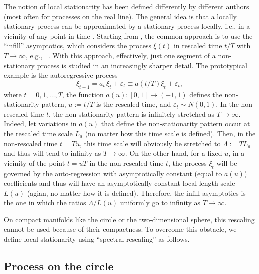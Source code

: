 \documentclass[12pt]{article}
\newcommand{\eg}{e.g.,\ }
\newcommand{\ie}{i.e., }
\begin{document}
The notion of local stationarity has been defined differently by different authors
(most often for  processes on the real line).
The general idea is that a locally stationary process can be approximated by a stationary process
locally, \ie in a vicinity of any point in time \citep{Mallat}.
Starting from \citet{Dahlhaus1997}, the common approach 
is to use the ``infill'' asymptotics, which considers the process $\xi(t)$
in rescaled time $t/T$ with  $T \to \infty$, \eg  
\citet[][]{Dahlhaus2012}.
With this approach, effectively, just one segment of a non-stationary process is studied
in an increasingly sharper detail.
The prototypical example is the autoregressive process 
%
\begin {equation}
\label{Dahl1}
\xi_{t+1} = a_t \,\xi_t +  \varepsilon_t \equiv  a(t/T) \xi_t +  \varepsilon_t,
\end {equation}
%
where $t=0,1,\dots,T$, the function $a(u): [0,1] \to (-1,1)$ defines the non-stationarity pattern,
$u:=t/T$ is the rescaled time, and $\varepsilon_t \sim N(0,1)$.
In the non-rescaled time $t$,  
the non-stationarity pattern is infinitely stretched
as $T \to \infty$.
Indeed, let variations in $a(u)$ that define the non-stationarity pattern occur at the rescaled time scale 
$L_a$ (no matter how this time scale is defined).
Then, in the non-rescaled time $t=Tu$, this time scale will obviously be stretched to
$\Lambda := T L_a$ and thus will tend to infinity as $T \to \infty$.
On the other hand,  for a fixed $u$,
in a vicinity of the point $t=uT$ in the non-rescaled time $t$,
the process $\xi_t$ will be governed by the auto-regression with asymptotically constant (equal to $a(u)$)
coefficients and thus will have an asymptotically constant local length scale $L(u)$ 
(agian, no matter how it is defined). 
Therefore, the infill asymptotics is the one in which the ratios
$\Lambda/L(u)$ uniformly go to infinity as $T \to \infty$.

On compact manifolds like the circle or the two-dimensional sphere, this rescaling
cannot be used because of their compactness. 
To overcome this obstacle, we define local stationarity using ``spectral rescaling'' as follows.




\subsection{Process on the circle}
\label{App_locStatio_S1} 
\end{document}

